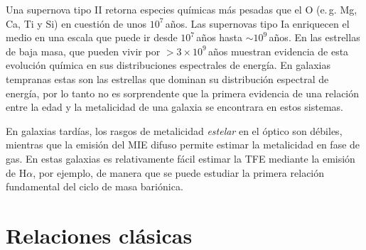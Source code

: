 \documentclass{article}
\begin{document}
Una supernova tipo II retorna especies químicas más pesadas que el O (e.\,g. Mg, Ca, Ti y Si) en
cuestión de unos $10^7\,$años.
Las supernovas tipo Ia enriquecen el medio en una escala que puede ir desde $10^7\,$años hasta
$\sim10^9\,$años.
En las estrellas de baja masa, que pueden vivir por $>3\times10^9\,$años muestran evidencia de esta
evolución química en sus distribuciones espectrales de energía.
En galaxias tempranas estas son las estrellas que dominan su distribución espectral de energía, por
lo tanto no es sorprendente que la primera evidencia de una relación entre la edad y la metalicidad
de una galaxia se encontrara en estos sistemas.

En galaxias tardías, los rasgos de metalicidad \emph{estelar} en el óptico son débiles, mientras que
la emisión del MIE difuso permite estimar la metalicidad en fase de gas.
En estas galaxias es relativamente fácil estimar la TFE mediante la emisión de H$\alpha$, por
ejemplo, de manera que se puede estudiar la primera relación fundamental del ciclo de masa
bariónica.



\section{Relaciones clásicas}
\end{document}
